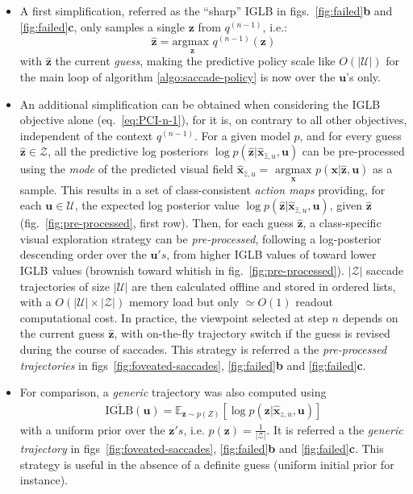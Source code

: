 \documentclass[12pt,twoside,openright]{article}
\begin{document}
\begin{itemize}
	\item A first simplification, referred as the ``sharp'' IGLB in  figs.~\ref{fig:failed}\textbf{b} and \ref{fig:failed}\textbf{c}, only samples a single $\boldsymbol{z}$ from $q^{(n-1)}$, i.e.: 
	$$ \hat{\boldsymbol{z}} = \underset{\boldsymbol{z}}{\text{argmax }} q^{(n-1)}(\boldsymbol{z})$$
	{\color{Purple}with $\hat{\boldsymbol{z}}$ the current \emph{guess}}, making the predictive policy scale like $O(|\mathcal{U}|)$ {\color{Purple}for the main loop of algorithm \ref{algo:saccade-policy} is now over the $\boldsymbol{u}$'s only}. 
	\item An additional simplification can be obtained when considering the IGLB objective alone (eq.~\ref{eq:PCI-n-1}), for it is, on contrary to all other objectives, independent of the context $q^{(n-1)}$. For a given model $p$, and for every guess $\hat{\boldsymbol{z}} \in \mathcal{Z}$, all the predictive log posteriors $\log p(\hat{\boldsymbol{z}}|\hat{\boldsymbol{x}}_{\hat{z},u}, \boldsymbol{u})$ can be pre-processed using the \emph{mode} of the predicted visual field $\hat{\boldsymbol{x}}_{\hat{z},u} = \underset{\boldsymbol{x}}{\text{ argmax }} p(\boldsymbol{x}|\hat{\boldsymbol{z}}, \boldsymbol{u})$ as a sample. {\color{Purple} This results in a set of class-consistent \emph{action maps} providing, for each $\boldsymbol{u} \in \mathcal{U}$, the expected log posterior value $\log p(\hat{\boldsymbol{z}}|\hat{\boldsymbol{x}}_{\hat{z},u}, \boldsymbol{u})$, given $\hat{\boldsymbol{z}}$ (fig.~\ref{fig:pre-processed}, first row)}. Then, for each guess $\hat{\boldsymbol{z}}$,  a class-specific visual exploration strategy can be \emph{pre-processed}, following a log-posterior descending order over the $\boldsymbol{u}'s$, {\color{Purple} from higher IGLB values of toward lower IGLB values (brownish toward whitish in fig.~\ref{fig:pre-processed})}.  $|\mathcal{Z}|$ saccade trajectories of size $|\mathcal{U}|$ are then calculated offline and stored  in ordered lists, with a $O(|\mathcal{U}|\times|\mathcal{Z}|)$ memory load but only $\simeq O(1)$ readout computational cost. 
	In practice, the viewpoint selected at step $n$ depends on the current guess $\hat{\boldsymbol{z}}$, with on-the-fly trajectory switch if the guess is revised during the course of saccades. This strategy is referred a the \emph{pre-processed trajectories} in figs~\ref{fig:foveated-saccades}, \ref{fig:failed}\textbf{b} and \ref{fig:failed}\textbf{c}. 
	\item For comparison, a \emph{generic} trajectory was also computed using \begin{align}
	\overline{\text{IGLB}}(\boldsymbol{u})
	= \mathbb{E}_{\boldsymbol{z} \sim p(Z)}\left[ \log p(\boldsymbol{z}|\hat{\boldsymbol{x}}_{z,u}, \boldsymbol{u})\right]
	\end{align} with a uniform prior over the $\boldsymbol{z}'s$, i.e. $p(\boldsymbol{z}) = \frac{1}{|\mathcal{Z}|}$.
	It is referred a the \emph{generic trajectory} in figs~\ref{fig:foveated-saccades}, \ref{fig:failed}\textbf{b} and \ref{fig:failed}\textbf{c}. {\color{Purple} This strategy is useful in the absence of a definite guess (uniform initial prior for instance).}
\end{itemize}
\end{document}
